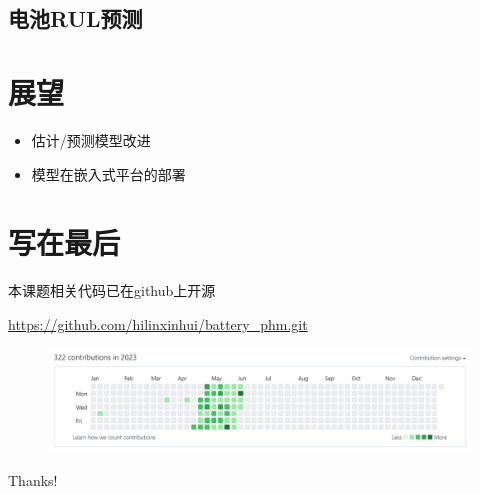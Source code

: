 \documentclass{beamer}
\begin{document}
\subsection{电池RUL预测}

\section{展望}

\begin{frame}
\begin{itemize}
\item 估计/预测模型改进
\item 模型在嵌入式平台的部署
\end{itemize}
\end{frame}

\section{写在最后}

\begin{frame}
	\centering
	本课题相关代码已在github上开源

	\centering
	\url {https://github.com/hilinxinhui/battery_phm.git}

	\begin{figure}[htbp]
		\centering
		\includegraphics[scale=0.4]{figures/github_contribution_log.png}
		
	\end{figure}

\end{frame}

\begin{frame}
\begin{center}
{\Huge Thanks!}
\end{center}
\end{frame}
\end{document}
